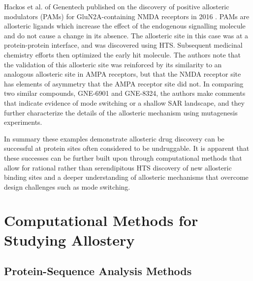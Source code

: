 \par Hackos et al. of Genentech published on the discovery of positive allosteric modulators (PAMs) for GluN2A-containing NMDA receptors in 2016 \cite{Hackos2016}. PAMs are allosteric ligands which increase the effect of the endogenous signalling molecule and do not cause a change in its absence. The allosteric site in this case was at a protein-protein interface, and was discovered using HTS. Subsequent medicinal chemistry efforts then optimized the early hit molecule. The authors note that the validation of this allosteric site was reinforced by its similarity to an analogous allosteric site in AMPA receptors, but that the NMDA receptor site has elements of asymmetry that the AMPA receptor site did not. In comparing two similar compounds, GNE-6901 and GNE-8324, the authors make comments that indicate evidence of mode switching or a shallow SAR landscape, and they further characterize the details of the allosteric mechanism using mutagenesis experiments.
\par In summary these examples demonstrate allosteric drug discovery can be successful at protein sites often considered to be undruggable. It is apparent that these successes can be further built upon through computational methods that allow for rational rather than serendipitous HTS discovery of new allosteric binding sites and a deeper understanding of allosteric mechanisms that overcome design challenges such as mode switching.




\section{Computational Methods for Studying Allostery}
\subsection{Protein-Sequence Analysis Methods}
